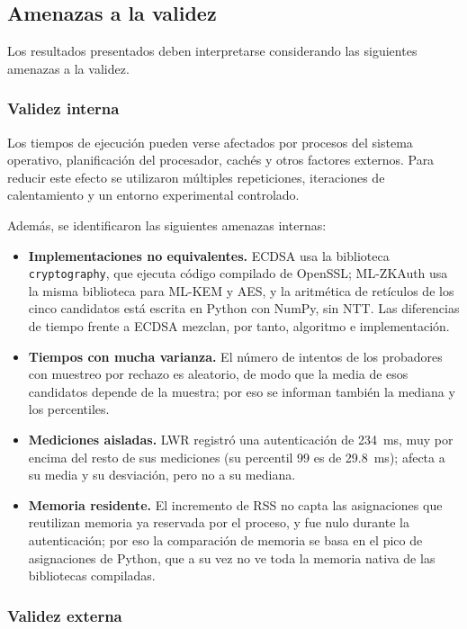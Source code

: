 \subsection{Amenazas a la validez}
\label{sec:threats-validity}

Los resultados presentados deben interpretarse considerando las siguientes amenazas a
la validez.

\subsubsection{Validez interna}

Los tiempos de ejecución pueden verse afectados por procesos del sistema operativo,
planificación del procesador, cachés y otros factores externos. Para reducir este
efecto se utilizaron múltiples repeticiones, iteraciones de calentamiento y un entorno
experimental controlado.

Además, se identificaron las siguientes amenazas internas:
\begin{itemize}
    \item \textbf{Implementaciones no equivalentes.} ECDSA usa la biblioteca \texttt{cryptography}, que ejecuta código compilado de OpenSSL; ML-ZKAuth usa la misma biblioteca para ML-KEM y AES, y la aritmética de retículos de los cinco candidatos está escrita en Python con NumPy, sin NTT. Las diferencias de tiempo frente a ECDSA mezclan, por tanto, algoritmo e implementación.
    \item \textbf{Tiempos con mucha varianza.} El número de intentos de los probadores con muestreo por rechazo es aleatorio, de modo que la media de esos candidatos depende de la muestra; por eso se informan también la mediana y los percentiles.
    \item \textbf{Mediciones aisladas.} LWR registró una autenticación de 234~ms, muy por encima del resto de sus mediciones (su percentil 99 es de 29.8~ms); afecta a su media y su desviación, pero no a su mediana.
    \item \textbf{Memoria residente.} El incremento de RSS no capta las asignaciones que reutilizan memoria ya reservada por el proceso, y fue nulo durante la autenticación; por eso la comparación de memoria se basa en el pico de asignaciones de Python, que a su vez no ve toda la memoria nativa de las bibliotecas compiladas.
\end{itemize}


\subsubsection{Validez externa}

